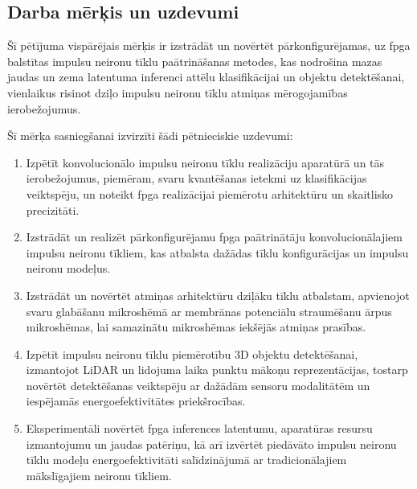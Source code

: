 \subsection{Darba mērķis un uzdevumi}
Šī pētījuma vispārējais mērķis ir izstrādāt un novērtēt pārkonfigurējamas, uz \Gls{fpga} balstītas impulsu neironu tīklu
paātrināšanas metodes, kas nodrošina mazas jaudas un zema latentuma inferenci attēlu klasifikācijai un objektu detektēšanai,
vienlaikus risinot dziļo impulsu neironu tīklu atmiņas mērogojamības ierobežojumus.

Šī mērķa sasniegšanai izvirzīti šādi pētnieciskie uzdevumi:
\begin{enumerate}
\item Izpētīt konvolucionālo impulsu neironu tīklu realizāciju aparatūrā un tās ierobežojumus, piemēram, svaru
  kvantēšanas ietekmi uz klasifikācijas veiktspēju, un noteikt \Gls{fpga} realizācijai piemērotu arhitektūru un skaitlisko
    precizitāti.

\item Izstrādāt un realizēt pārkonfigurējamu \Gls{fpga} paātrinātāju konvolucionālajiem impulsu neironu tīkliem, kas atbalsta
  dažādas tīklu konfigurācijas un impulsu neironu modeļus.

\item Izstrādāt un novērtēt atmiņas arhitektūru dziļāku tīklu atbalstam, apvienojot svaru glabāšanu mikroshēmā ar membrānas
  potenciālu straumēšanu ārpus mikroshēmas, lai samazinātu mikroshēmas iekšējās atmiņas prasības.

\item Izpētīt impulsu neironu tīklu piemērotību 3D objektu detektēšanai, izmantojot LiDAR un lidojuma laika punktu mākoņu
  reprezentācijas, tostarp novērtēt detektēšanas veiktspēju ar dažādām sensoru modalitātēm un iespējamās energoefektivitātes
    priekšrocības.

\item Eksperimentāli novērtēt \Gls{fpga} inferences latentumu, aparatūras resursu izmantojumu un jaudas patēriņu, kā arī
  izvērtēt piedāvāto impulsu neironu tīklu modeļu energoefektivitāti salīdzinājumā ar tradicionālajiem mākslīgajiem neironu
    tīkliem.

\end{enumerate}

